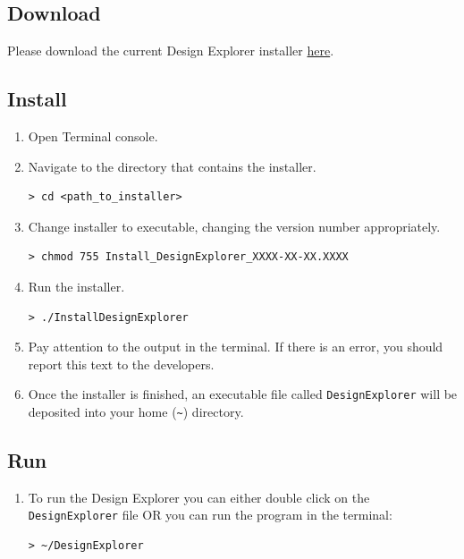 \documentclass[10pt]{article}
\begin{document}
	\subsection{Download}
	\label{subsec:dl}
		Please download the current Design Explorer installer \href{https://www.dropbox.com/s/mqvr5v7393eyorn/Install_DesignExplorer_2016-10-26.0958?dl=1}{here}.

	\subsection{Install}
	\label{subsec:install}
		\begin{enumerate}
			\item Open Terminal console.
			\item Navigate to the directory that contains the installer.
\begin{lstlisting}
> cd <path_to_installer>
\end{lstlisting}
			\item Change installer to executable, changing the version number appropriately.
\begin{lstlisting}
> chmod 755 Install_DesignExplorer_XXXX-XX-XX.XXXX
\end{lstlisting}
			\item Run the installer.
\begin{lstlisting}
> ./InstallDesignExplorer
\end{lstlisting}
			\item Pay attention to the output in the terminal.
			If there is an error, you should report this text to the developers.
			\item Once the installer is finished, an executable file called \texttt{DesignExplorer} will be deposited into your home (\texttt{\textasciitilde}) directory.
		\end{enumerate}

	\subsection{Run}
	\label{subsec:run}
		\begin{enumerate}
		\item To run the Design Explorer you can either double click on the \texttt{DesignExplorer} file OR you can run the program in the terminal:
\begin{lstlisting}
> ~/DesignExplorer
\end{lstlisting}
		\end{enumerate}
\end{document}
